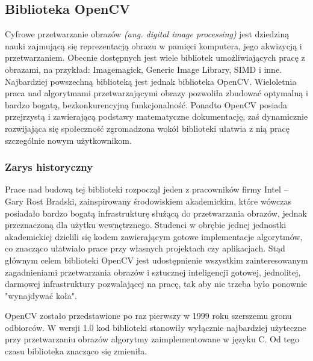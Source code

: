 \documentclass[a4paper,12pt]{article}
\newcommand\spacingIndent{2.2em}
\begin{document}
		\subsection{Biblioteka OpenCV}
		\hspace{\spacingIndent} Cyfrowe przetwarzanie obrazów \textit{(ang. digital image processing)} jest dziedziną nauki 
			zajmującą się reprezentacją obrazu w pamięci komputera, jego akwizycją i przetwarzaniem. 
         Obecnie dostępnych jest wiele bibliotek umożliwiających pracę z obrazami, na przykład: Imagemagick, Generic Image Library, SIMD i inne. 
			Najbardziej powszechną biblioteką jest jednak biblioteka OpenCV. Wieloletnia praca nad algorytmami przetwarzającymi obrazy pozwoliła zbudować optymalną i bardzo bogatą, bezkonkurencyjną funkcjonalność.
			Ponadto OpenCV posiada przejrzystą 
			i zawierającą podstawy matematyczne dokumentację, zaś dynamicznie rozwijająca się społeczność zgromadzona wokół biblioteki ułatwia 
			z nią pracę szczególnie nowym użytkownikom.
		\subsubsection{Zarys historyczny}
			\hspace{\spacingIndent} Prace nad budową tej biblioteki rozpoczął jeden z pracowników firmy Intel -- Gary Rost Bradski, 
				zainspirowany środowiskiem akademickim, które wówczas posiadało bardzo bogatą infrastrukturę służącą do przetwarzania obrazów, 
				jednak przeznaczoną dla użytku wewnętrznego. Studenci w obrębie jednej jednostki akademickiej dzielili się kodem zawierającym gotowe 
				implementacje algorytmów, co znacząco ułatwiało prace przy własnych projektach czy aplikacjach. Stąd głównym celem biblioteki OpenCV 
				jest udostępnienie wszystkim zainteresowanym zagadnieniami przetwarzania obrazów i sztucznej inteligencji gotowej, jednolitej, 
				darmowej infrastruktury pozwalającej na pracę, tak aby nie trzeba było ponownie "wynajdywać koła". 
				
			OpenCV zostało przedstawione po raz pierwszy w 1999 roku szerszemu gronu odbiorców.  W wersji 1.0 kod biblioteki stanowiły wyłącznie najbardziej użyteczne przy przetwarzaniu obrazów algorytmy zaimplementowane w języku C. 
				Od tego czasu biblioteka znacząco się zmieniła. 
			
\end{document}
